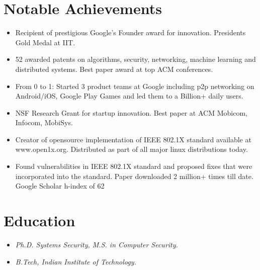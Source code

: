\documentclass[letterpaper,10pt]{article}
\newcommand{\resumeItem}[1]{
  \item\small{
    {#1 \vspace{-2pt}}
  }
}
\begin{document}
\section{Notable Achievements}
    \begin{itemize}[leftmargin=3.5em, itemsep=0pt, label=\tiny$\bullet$]
     \resumeItem {Recipient of prestigious Google’s Founder award for innovation. Presidents Gold Medal at IIT.}
     \resumeItem {52 awarded patents on algorithms, security, networking, machine learning and distributed systems. Best paper award at top ACM conferences.}
     \resumeItem {From 0 to 1: Started 3 product teams at Google including p2p networking on Android/iOS, Google Play Games and led them to a Billion+ daily users.}
     \resumeItem {NSF Research Grant for startup innovation. Best paper at ACM Mobicom, Infocom, MobiSys.}
     \resumeItem {Creator of opensource implementation of IEEE 802.1X standard available at www.open1x.org. Distributed as part of all major linux distributions today.}
     \resumeItem {Found vulnerabilities in IEEE 802.1X standard and proposed fixes that were incorporated into the standard. Paper downloaded 2 million+ times till date. Google Scholar h-index of 62}
   \end{itemize}


\section{Education}
  \begin{itemize}
    \item[] \textit{\small Ph.D. Systems Security, M.S. in Computer Security.}
    \item[] \textit{\small B.Tech, Indian Institute of Technology.}\hspace{2pt}{\small Guwahati, India}
  \end{itemize}
\end{document}
